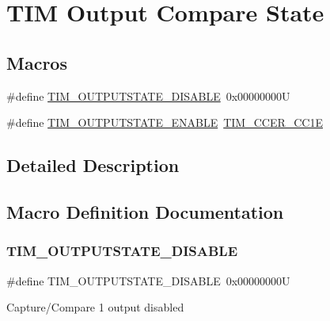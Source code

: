 \hypertarget{group___t_i_m___output___compare___state}{}\section{T\+IM Output Compare State}
\label{group___t_i_m___output___compare___state}
\subsection*{Macros}
\begin{DoxyCompactItemize}
\item 
\#define \mbox{\hyperlink{group___t_i_m___output___compare___state_ga98fa585adffeb0d3654b47040576c6b7}{T\+I\+M\+\_\+\+O\+U\+T\+P\+U\+T\+S\+T\+A\+T\+E\+\_\+\+D\+I\+S\+A\+B\+LE}}~0x00000000U
\item 
\#define \mbox{\hyperlink{group___t_i_m___output___compare___state_ga114555abc521311f689478a7e0a9ace9}{T\+I\+M\+\_\+\+O\+U\+T\+P\+U\+T\+S\+T\+A\+T\+E\+\_\+\+E\+N\+A\+B\+LE}}~\mbox{\hyperlink{group___peripheral___registers___bits___definition_ga3f494b9881e7b97bb2d79f7ad4e79937}{T\+I\+M\+\_\+\+C\+C\+E\+R\+\_\+\+C\+C1E}}
\end{DoxyCompactItemize}


\subsection{Detailed Description}


\subsection{Macro Definition Documentation}
\mbox{\label{group___t_i_m___output___compare___state_ga98fa585adffeb0d3654b47040576c6b7}} 
\subsubsection{\texorpdfstring{TIM\_OUTPUTSTATE\_DISABLE}{TIM\_OUTPUTSTATE\_DISABLE}}
{\footnotesize\ttfamily \#define T\+I\+M\+\_\+\+O\+U\+T\+P\+U\+T\+S\+T\+A\+T\+E\+\_\+\+D\+I\+S\+A\+B\+LE~0x00000000U}

Capture/\+Compare 1 output disabled \mbox{\label{group___t_i_m___output___compare___state_ga114555abc521311f689478a7e0a9ace9}} 
